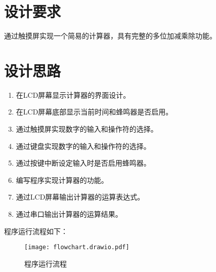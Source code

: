 \documentclass{theme-2639013-final}
\begin{document}

\makecover


\section{设计要求}

通过触摸屏实现一个简易的计算器，具有完整的多位加减乘除功能。

\section{设计思路}

\begin{enumerate}
  \item 在LCD屏幕显示计算器的界面设计。
  \item 在LCD屏幕底部显示当前时间和蜂鸣器是否启用。
  \item 通过触摸屏实现数字的输入和操作符的选择。
  \item 通过键盘实现数字的输入和操作符的选择。
  \item 通过按键中断设定输入时是否启用蜂鸣器。
  \item 编写程序实现计算器的功能。
  \item 通过LCD屏幕输出计算器的运算表达式。
  \item 通过串口输出计算器的运算结果。
\end{enumerate}

程序运行流程如下：

\begin{figure}[H]
  \centering\texttt{[image: flowchart.drawio.pdf]}
  \caption{程序运行流程}
\end{figure}
\end{document}
